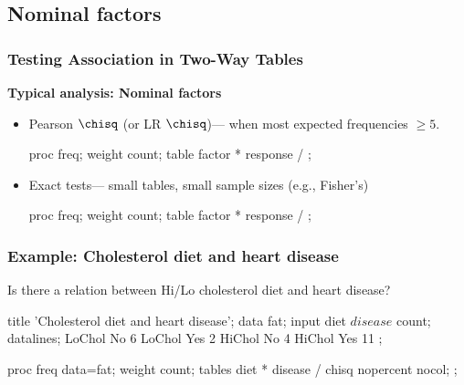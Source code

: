 \renewcommand{\FileName}{assoc}
\subsection{Nominal factors}
\begin{frame}[fragile]
  \frametitle{Testing Association in Two-Way Tables}
  \begin{block}{\large\bfseries Typical analysis: Nominal factors}
  \end{block}
      \begin{itemize}
	  \item Pearson $\chisq$ (or LR $\chisq$)--- when most expected
	  frequencies $\ge 5$.

\begin{listing}[frame=single]
proc freq;
   weight count;        
   table factor * response / ; 
\end{listing}

	  \item Exact tests--- small tables, small sample sizes (e.g., Fisher's)

\begin{listing}[frame=single]
proc freq;
   weight count;        
   table factor * response / ;
\end{listing}
	  \end{itemize}
\end{frame}

\begin{frame}[fragile]
  \frametitle{Example: Cholesterol diet and heart disease}
Is there a relation between Hi/Lo cholesterol diet and heart disease?
\vspace{2ex}

\begin{Input}[fontsize=\footnotesize,label=\fbox{\texttt{fat.sas}},baselinestretch=0.8]
title 'Cholesterol diet and heart disease';
data fat;
   input diet $ disease $ count;
datalines;
LoChol  No   6
LoChol  Yes  2
HiChol  No   4
HiChol  Yes 11
;

proc freq data=fat;
  weight count;
  tables diet * disease / chisq nopercent nocol;
  ;
\end{Input}
\end{frame}

